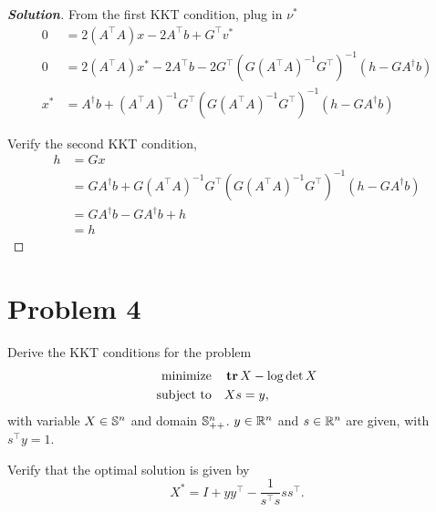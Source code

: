 \documentclass[11pt]{article}
\newenvironment{solution}
  {\renewcommand\qedsymbol{$\square$}\begin{proof}[\textbf{Solution}]}
  {\end{proof}}
\newcommand{\T}{^\top}          %
\begin{document}
\begin{solution}
From the first KKT condition, plug in $\nu^*$
\begin{align*}
    0 &= 2(A\T A)x - 2A^\top b + G^\top v^* \\
    0 &= 2(A\T A)x^* - 2A^\top b - 2 G^\top (G (A\T A)^{-1} G^\top)^{-1} (h - G A^\dagger b) \\
    x^* &= A^\dagger b + (A\T A)^{-1} G^\top (G (A\T A)^{-1} G^\top)^{-1} (h - G A^\dagger b)
\end{align*}

Verify the second KKT condition, 
\begin{align*}
    h &= Gx\\
    &= G A^\dagger b + G (A\T A)^{-1} G^\top (G (A\T A)^{-1} G^\top)^{-1} (h - G A^\dagger b)\\
    &= G A^\dagger b - G A^\dagger b + h\\
    &= h
\end{align*}
\end{solution}


\clearpage
\section*{Problem 4}
Derive the KKT conditions for the problem
\begin{align*}
  \text{minimize} \quad & \mathop{\textbf{tr}} X - \log\det X\\
  \text{subject to} \quad & Xs = y,
\end{align*}
with variable $X\in{{\mathbb{S}}}^n$ and domain ${{\mathbb{S}}}^n_{++}$. $y\in{{\mathbb{R}}}^n$ and $s\in{{\mathbb{R}}}^n$ are given, with $s\T y = 1$.

Verify that the optimal solution is given by
\[
  X^* = I + yy\T - \frac{1}{s\T s} s s\T.
\]
\end{document}

